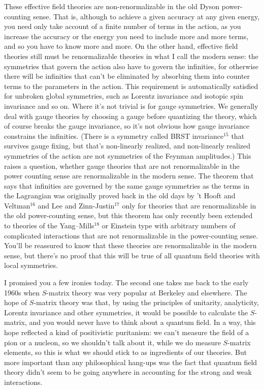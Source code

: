 These effective field theories are
non-renormalizable in the old Dyson power-counting sense.
That is, although to achieve a given accuracy at any given
energy,  you need only take account of a finite number of
terms in the action, as you increase the accuracy or the
energy you need to include more and more terms,  and so you
have to know more and  more.     On the other hand,
effective field theories still must be renormalizable
theories in what I call the modern sense:  the symmetries
that govern the action also have to govern the infinities,
for otherwise there will be infinities that can't be
eliminated by absorbing them into counter terms to the
parameters in the action.      This requirement is
automatically satisfied for unbroken global symmetries, such
as Lorentz invariance and isotopic spin invariance and so
on. Where it's not trivial is for gauge symmetries. We
generally deal with gauge theories by choosing a gauge
before quantizing the theory, which of course breaks the
gauge invariance, so it's not obvious how gauge invariance
constrains the infinities.   (There is a symmetry called
BRST invariance$^{15}$ that survives gauge fixing, but
that's non-linearly realized, and non-linearly realized
symmetries of
the action are not symmetries of the Feynman amplitudes.)
This raises a question, whether gauge theories that are not
renormalizable in the power counting sense are
renormalizable in the modern sense.   The theorem that says
that infinities are governed by the same gauge symmetries as
the terms in the Lagrangian was originally proved back in
the old days by 't Hooft and Veltman$^{16}$ and Lee and
Zinn-Justin$^{17}$
only for theories that are renormalizable in the old
power-counting sense, but this theorem has only recently
been
extended to theories of the Yang--Mills$^{18}$ or Einstein
type
with arbitrary numbers of complicated interactions that are
not renormalizable in the power-counting
sense.   You'll be reassured to know that these
theories are renormalizable in the modern sense, but there's
no proof that this will be true of all quantum field
theories with local symmetries.

I promised you a few ironies today. The second one takes me
back to the early 1960s when $S$-matrix theory was very
popular at Berkeley and elsewhere.  The hope of $S$-matrix
theory was that, by using the principles of unitarity,
analyticity, Lorentz invariance and other symmetries, it
would be possible to calculate the $S$-matrix, and you would
never have to think about a quantum field. In a way, this
hope reflected a kind of positivistic puritanism: we can't
measure the field of a pion or a nucleon, so we shouldn't
talk about it, while we do measure $S$-matrix elements, so
this is what we should stick to as ingredients of our
theories. But more important than any philosophical hang-ups
was the fact that  quantum field theory  didn't seem to be
going anywhere in accounting for the strong and weak
interactions.

